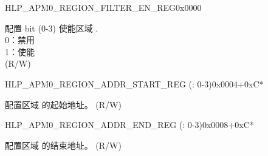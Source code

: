 \begin{register}{H}{LP\_APM0\_REGION\_FILTER\_EN\_REG}{0x0000}\label{regdesc:LPAPM0REGIONFILTERENREG}
%
%
\regnewline%
\begin{regdesc}\begin{reglist}
\label{fielddesc:LPAPM0REGIONFILTEREN}\item [LP\_APM0\_REGION\_FILTER\_EN] 配置 bit (0-3) 使能区域 .\\
0：禁用 \\
1：使能  \\ (R/W)
\end{reglist}\end{regdesc}
\end{register}


\begin{register}{H}{LP\_APM0\_REGION\_ADDR\_START\_REG (: 0-3)}{0x0004+0xC*}\label{regdesc:LPAPM0REGION0ADDRSTARTREG}
%
\regnewline%
\begin{regdesc}\begin{reglist}
\label{fielddesc:LPAPM0REGION0ADDRSTART}\item [LP\_APM0\_REGION\regindex{n}\_ADDR\_START] 配置区域  的起始地址。 (R/W)
\end{reglist}\end{regdesc}
\end{register}

\begin{register}{H}{LP\_APM0\_REGION\_ADDR\_END\_REG (: 0-3)}{0x0008+0xC*}\label{regdesc:LPAPM0REGION0ADDRENDREG}
%
\regnewline%
\begin{regdesc}\begin{reglist}
\label{fielddesc:LPAPM0REGION0ADDREND}\item [LP\_APM0\_REGION\regindex{n}\_ADDR\_END] 配置区域  的结束地址。 (R/W)
\end{reglist}\end{regdesc}
\end{register}

















